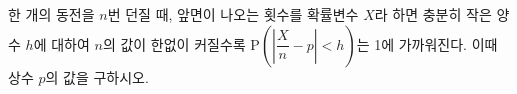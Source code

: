 한 개의 동전을 $n$번 던질 때, 앞면이 나오는 횟수를 확률변수 $X$라 하면 충분히 작은 양수 $h$에 대하여 $n$의 값이 한없이 커질수록 $\mathrm{P}\left(\left|\dfrac{X}{n}-p\right|<h\right)$는 1에 가까워진다. 이때 상수 $p$의 값을 구하시오.
